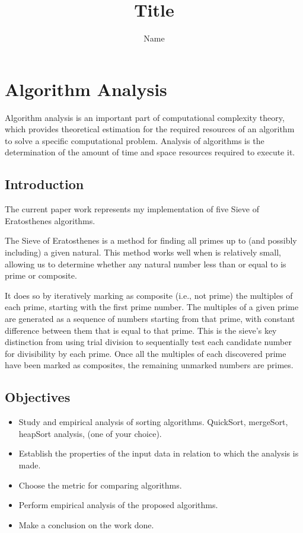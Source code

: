 \documentclass[a4paper, 12pt]{article}
\author{Name}
\title{Title}
\begin{document}
\pgfplotsset{compat=1.17}

\tableofcontents

\newpage

\section{Algorithm Analysis}

Algorithm analysis is an important part of computational complexity theory, which provides
theoretical estimation for the required resources of an algorithm to solve a specific computational problem. Analysis of algorithms is the determination of the amount of time and space
resources required to execute it.

\subsection{Introduction}

The current paper work represents my implementation of five Sieve of Eratosthenes algorithms. 

\hfill \break
\indent The Sieve of Eratosthenes is a method for finding all primes up to (and possibly including) a given natural. This method works well when is relatively small, allowing us to determine whether any natural number less than or equal to is prime or composite.

It does so by iteratively marking as composite (i.e., not prime) the 
multiples of each prime, starting with the first prime number. The 
multiples of a given prime are generated as a sequence of numbers 
starting from that prime, with constant difference between them that 
is equal to that prime. This is the sieve's key distinction from 
using trial division to sequentially test each candidate number for 
divisibility by each prime. Once all the multiples of each discovered 
prime have been marked as composites, the remaining unmarked numbers are 
primes.

\subsection{Objectives}

\begin{itemize}
  \item Study and empirical analysis of sorting algorithms. QuickSort, mergeSort, heapSort analysis, (one of your choice).
  \item Establish the properties of the input data in relation to which the analysis is made.
  \item Choose the metric for comparing algorithms.
  \item Perform empirical analysis of the proposed algorithms.
  \item Make a conclusion on the work done.
\end{itemize}
\end{document}
